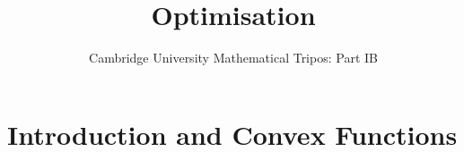 \documentclass{article}
\title{Optimisation}
\author{Cambridge University Mathematical Tripos: Part IB}
\begin{document}
\maketitle

\tableofcontentsnewpage{}

\section{Introduction and Convex Functions}

\end{document}

